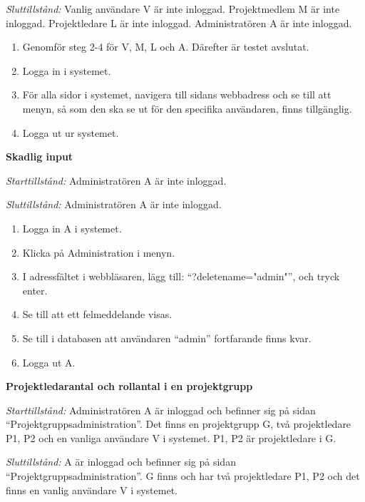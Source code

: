 \documentclass[a4paper]{article}
\begin{document}
\begin{FT}
\emph{Sluttillstånd:} Vanlig användare V är inte inloggad. Projektmedlem M är inte inloggad. Projektledare L är inte inloggad. Administratören A är inte inloggad.

\begin{enumerate}
\item Genomför steg 2-4 för V, M, L och A. Därefter är testet avslutat.
\item Logga in i systemet.
\item För alla sidor i systemet, navigera till sidans webbadress och se till att menyn, så som den ska se ut för den specifika användaren, finns tillgänglig.
\item Logga ut ur systemet.
\end{enumerate}

\item \textbf{Skadlig input}

\emph{Starttillstånd:} Administratören A är inte inloggad.

\emph{Sluttillstånd:} Administratören A är inte inloggad.

\begin{enumerate}
\item Logga in A i systemet.
\item Klicka på Administration i menyn.
\item I adressfältet i webbläsaren, lägg till: ``?deletename="admin"'', och tryck enter.
\item Se till att ett felmeddelande visas.
\item Se till i databasen att användaren ``admin'' fortfarande finns kvar.
\item Logga ut A.
\end{enumerate}

\item \textbf{Projektledarantal och rollantal i en projektgrupp}

\emph{Starttillstånd:} Administratören A är inloggad och befinner sig på sidan ``Projektgruppsadministration''. Det finns en projektgrupp G, två projektledare P1, P2 och en vanliga användare V i systemet. P1, P2 är projektledare i G.

\emph{Sluttillstånd:} A är inloggad och befinner sig på sidan ``Projektgruppsadministration''.  G finns och har två projektledare P1, P2 och det finns en vanlig användare V i systemet.


\end{FT}
\end{document}
